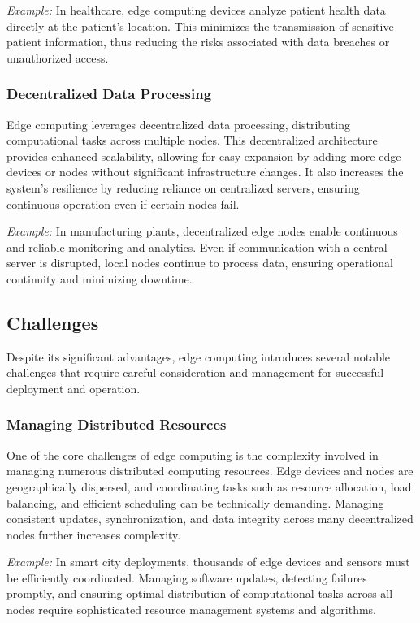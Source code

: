 \documentclass[runningheads]{llncs}
\begin{document}
\textit{Example:} In healthcare, edge computing devices analyze patient health data directly at the patient's location. This minimizes the transmission of sensitive patient information, thus reducing the risks associated with data breaches or unauthorized access.

\subsubsection{Decentralized Data Processing}
Edge computing leverages decentralized data processing, distributing computational tasks across multiple nodes. This decentralized architecture provides enhanced scalability, allowing for easy expansion by adding more edge devices or nodes without significant infrastructure changes. It also increases the system’s resilience by reducing reliance on centralized servers, ensuring continuous operation even if certain nodes fail.

\textit{Example:} In manufacturing plants, decentralized edge nodes enable continuous and reliable monitoring and analytics. Even if communication with a central server is disrupted, local nodes continue to process data, ensuring operational continuity and minimizing downtime.


\subsection{Challenges}

Despite its significant advantages, edge computing introduces several notable challenges that require careful consideration and management for successful deployment and operation.

\subsubsection{Managing Distributed Resources}
One of the core challenges of edge computing is the complexity involved in managing numerous distributed computing resources. Edge devices and nodes are geographically dispersed, and coordinating tasks such as resource allocation, load balancing, and efficient scheduling can be technically demanding. Managing consistent updates, synchronization, and data integrity across many decentralized nodes further increases complexity.

\textit{Example:} In smart city deployments, thousands of edge devices and sensors must be efficiently coordinated. Managing software updates, detecting failures promptly, and ensuring optimal distribution of computational tasks across all nodes require sophisticated resource management systems and algorithms.
\end{document}
